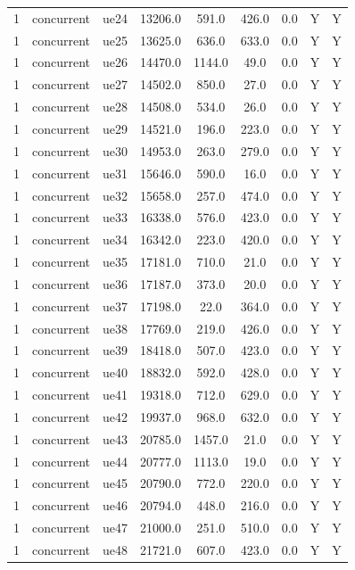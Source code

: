 \begin{table}[ht]
\begin{tabular}{|c|c|c|c|c|c|c|c|c|}
1 & concurrent & ue24 & 13206.0 & 591.0 & 426.0 & 0.0 & Y & Y \\
1 & concurrent & ue25 & 13625.0 & 636.0 & 633.0 & 0.0 & Y & Y \\
1 & concurrent & ue26 & 14470.0 & 1144.0 & 49.0 & 0.0 & Y & Y \\
1 & concurrent & ue27 & 14502.0 & 850.0 & 27.0 & 0.0 & Y & Y \\
1 & concurrent & ue28 & 14508.0 & 534.0 & 26.0 & 0.0 & Y & Y \\
1 & concurrent & ue29 & 14521.0 & 196.0 & 223.0 & 0.0 & Y & Y \\
1 & concurrent & ue30 & 14953.0 & 263.0 & 279.0 & 0.0 & Y & Y \\
1 & concurrent & ue31 & 15646.0 & 590.0 & 16.0 & 0.0 & Y & Y \\
1 & concurrent & ue32 & 15658.0 & 257.0 & 474.0 & 0.0 & Y & Y \\
1 & concurrent & ue33 & 16338.0 & 576.0 & 423.0 & 0.0 & Y & Y \\
1 & concurrent & ue34 & 16342.0 & 223.0 & 420.0 & 0.0 & Y & Y \\
1 & concurrent & ue35 & 17181.0 & 710.0 & 21.0 & 0.0 & Y & Y \\
1 & concurrent & ue36 & 17187.0 & 373.0 & 20.0 & 0.0 & Y & Y \\
1 & concurrent & ue37 & 17198.0 & 22.0 & 364.0 & 0.0 & Y & Y \\
1 & concurrent & ue38 & 17769.0 & 219.0 & 426.0 & 0.0 & Y & Y \\
1 & concurrent & ue39 & 18418.0 & 507.0 & 423.0 & 0.0 & Y & Y \\
1 & concurrent & ue40 & 18832.0 & 592.0 & 428.0 & 0.0 & Y & Y \\
1 & concurrent & ue41 & 19318.0 & 712.0 & 629.0 & 0.0 & Y & Y \\
1 & concurrent & ue42 & 19937.0 & 968.0 & 632.0 & 0.0 & Y & Y \\
1 & concurrent & ue43 & 20785.0 & 1457.0 & 21.0 & 0.0 & Y & Y \\
1 & concurrent & ue44 & 20777.0 & 1113.0 & 19.0 & 0.0 & Y & Y \\
1 & concurrent & ue45 & 20790.0 & 772.0 & 220.0 & 0.0 & Y & Y \\
1 & concurrent & ue46 & 20794.0 & 448.0 & 216.0 & 0.0 & Y & Y \\
1 & concurrent & ue47 & 21000.0 & 251.0 & 510.0 & 0.0 & Y & Y \\
1 & concurrent & ue48 & 21721.0 & 607.0 & 423.0 & 0.0 & Y & Y \\

\end{tabular}
\end{table}

